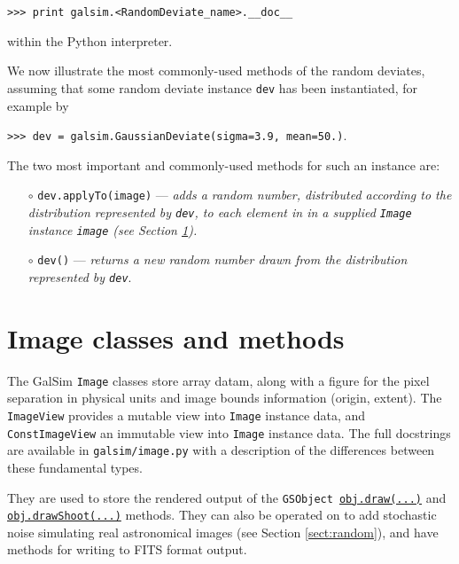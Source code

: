 \documentclass[preprint,11pt]{aastex}
\newcommand{\gsobject}{{\tt GSObject}}
\begin{document}
{\tt >>> print galsim.<RandomDeviate\_name>.\_\_doc\_\_}

within the Python interpreter.

We now illustrate the most commonly-used methods of the random
deviates, assuming that some random deviate instance \texttt{dev}
has been instantiated, for example by

{\tt >>> dev = galsim.GaussianDeviate(sigma=3.9, mean=50.)}.

The two most important and commonly-used methods for such an
instance are:
\begin{itemize}

\item[$\circ$] \texttt{dev.applyTo(image)} --- \emph{adds a random
    number,
  distributed according to the distribution represented by 
\texttt{dev}, to each element in in a supplied \texttt{Image} instance \texttt{image} (see Section \ref{sect:image}).}

\item[$\circ$] \texttt{dev()} --- \emph{returns a new random number drawn from the distribution
    represented by \texttt{dev}}.

\end{itemize}

\section{Image classes and methods}\label{sect:image}
The GalSim \texttt{Image} classes store array datam, along with a figure
for the pixel separation in physical units and
image bounds information (origin, extent).  The \texttt{ImageView}
provides a mutable view into \texttt{Image} instance data, and
\texttt{ConstImageView} an immutable view into
\texttt{Image} instance data.  The full docstrings are available in
\texttt{galsim/image.py} with a description of the differences between
these fundamental types.

They are used to store the rendered output of the
\gsobject~\href{http://galsim-developers.github.com/GalSim/classgalsim_1_1base_1_1_g_s_object.html#ae0b346a8b438dedbc7f60a52220869d8}{\texttt{obj.draw(...)}}
  and
  \href{http://galsim-developers.github.com/GalSim/classgalsim_1_1base_1_1_g_s_object.html#a42ac334d2840ba3fa832988e998beca0}{\texttt{obj.drawShoot(...)}}
  methods. They can also be
operated on to add stochastic noise simulating real astronomical
images (see Section \ref{sect:random}), and have methods for
writing to FITS format output.
\end{document}
